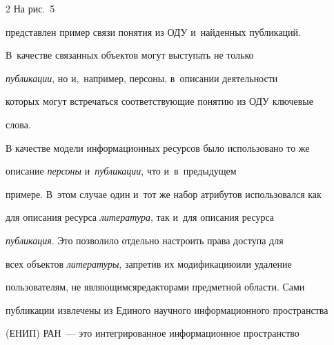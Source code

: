 \begin{multicols}{2}
На рис.~5 

представлен пример связи понятия из ОДУ и~найденных публикаций. 

В~качестве связанных объектов могут выступать не только 

\textit{публикации}, но и,~например, персоны, в~описании деятельности 

которых могут встречаться соответствующие понятию из ОДУ ключевые 

слова.

    

    В качестве модели информационных ресурсов было использовано то же 

описание \textit{персоны} и~\textit{пуб\-ли\-ка\-ции}, что и~в~предыдущем 

примере. В~этом случае один и~тот же набор атрибутов использовался как 

для описания ресурса \textit{литература}, так и~для описания ресурса 

\textit{пуб\-ли\-ка\-ция}. Это позволило отдельно настроить права доступа для 

всех объектов \textit{литературы}, запретив их модификацию\linebreak или удаление 

пользователям, не являющимся\linebreak редакторами предметной области. Сами 

публикации извлечены из Единого научного информа\-ционного пространства 

(ЕНИП) РАН~--- это ин\-тегрированное информационное пространство\linebreak\vspace*{-12pt}



\pagebreak



\end{multicols}



